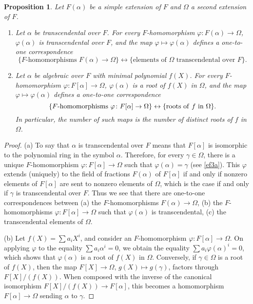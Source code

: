 \documentclass[a4paper,11pt,final,openany]{memoir}
\newtheorem{proposition}[X]{Proposition}
\theoremstyle{nonumberplain}
\newtheorem{proof}{Proof.}
\begin{document}
\begin{proposition}
\label{sf1} Let $F(\alpha)$ be a simple extension of $F$ and $\Omega$ a second
extension of $F$.

\begin{enumerate}
\item Let $\alpha$ be transcendental over $F$. For every $F$-homomorphism
$\varphi\colon F(\alpha)\rightarrow\Omega$, $\varphi(\alpha)$ is
transcendental over $F$, and the map $\varphi\mapsto\varphi(\alpha)$ defines a
one-to-one correspondence
\[
\{F\text{-homomorphisms }F(\alpha)\rightarrow\Omega\}\leftrightarrow
\{\text{elements of }\Omega\text{ transcendental over }F\}.
\]


\item Let $\alpha$ be algebraic over $F$ with minimal polynomial $f(X)$. For
every $F$-homomorphism $\varphi\colon F[\alpha]\rightarrow\Omega$,
$\varphi(\alpha)$ is a root of $f(X)$ in $\Omega$, and the map $\varphi
\mapsto\varphi(\alpha)$ defines a one-to-one correspondence
\[
\{F\text{-homomorphisms }\varphi\colon F[\alpha]\rightarrow\Omega
\}\leftrightarrow\{\text{roots of\textrm{\ }}f\text{\ in }\Omega\}.
\]
In particular, the number of such maps is the number of distinct roots of $f$
in $\Omega$.
\end{enumerate}
\end{proposition}

\begin{proof}
(a) To say that $\alpha$ is transcendental over $F$ means that $F[\alpha]$ is
isomorphic to the polynomial ring in the symbol $\alpha$. Therefore, for every
$\gamma\in\Omega$, there is a unique $F$-homomorphism $\varphi\colon
F[\alpha]\rightarrow\Omega$ such that $\varphi(\alpha)=\gamma$ (see
\ref{ef3a}). This $\varphi$ extends (uniquely) to the field of fractions
$F(\alpha)$ of $F[\alpha]$ if and only if nonzero elements of $F[\alpha]$ are
sent to nonzero elements of $\Omega$, which is the case if and only if
$\gamma$ is transcendental over $F$. Thus we see that there are one-to-one
correspondences between (a) the $F$-homomorphisms $F(\alpha)\rightarrow\Omega
$, (b) the $F$-homomorphisms $\varphi\colon F[\alpha]\rightarrow\Omega$ such
that $\varphi(\alpha)$ is transcendental, (c) the transcendental elements of
$\Omega$.

(b) Let $f(X)=\sum a_{i}X^{i}$, and consider an $F$-homomorphism
$\varphi\colon F[\alpha]\rightarrow\Omega$. On applying $\varphi$ to the
equality $\sum a_{i}\alpha^{i}=0$, we obtain the equality $\sum a_{i}%
\varphi(\alpha)^{i}=0$, which shows that $\varphi(\alpha)$ is a root of $f(X)$
in $\Omega$. Conversely, if $\gamma\in\Omega$ is a root of $f(X)$, then the
map $F[X]\rightarrow\Omega$, $g(X)\mapsto g(\gamma)$, factors through
$F[X]/(f(X))$. When composed with the inverse of the canonical isomorphism
$F[X]/(f(X))\rightarrow F[\alpha]$, this becomes a homomorphism $F[\alpha
]\rightarrow\Omega$ sending $\alpha$ to $\gamma$.
\end{proof}
\end{document}
